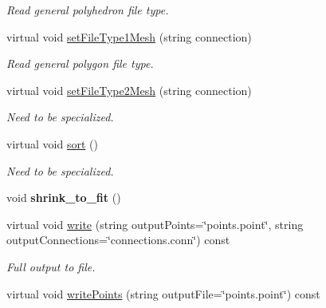 \begin{DoxyCompactItemize}
\begin{DoxyCompactList}\small\item\em \-Read general polyhedron file type. \end{DoxyCompactList}\item 
\hypertarget{class_mesh_a349da9279777b5cae335524136f85567}{virtual void \hyperlink{class_mesh_a349da9279777b5cae335524136f85567}{set\-File\-Type1\-Mesh} (string connection)}\label{class_mesh_a349da9279777b5cae335524136f85567}

\begin{DoxyCompactList}\small\item\em \-Read general polygon file type. \end{DoxyCompactList}\item 
\hypertarget{class_mesh_a03cb81990255eea926696f883279935e}{virtual void \hyperlink{class_mesh_a03cb81990255eea926696f883279935e}{set\-File\-Type2\-Mesh} (string connection)}\label{class_mesh_a03cb81990255eea926696f883279935e}

\begin{DoxyCompactList}\small\item\em \-Need to be specialized. \end{DoxyCompactList}\item 
virtual void \hyperlink{class_mesh_a5cb1110ec8bf2b1d089453f873df226f}{sort} ()
\begin{DoxyCompactList}\small\item\em \-Need to be specialized. \end{DoxyCompactList}\item 
\hypertarget{class_mesh_a9c9daf07927688c3a156ee1ef0c95900}{void {\bfseries shrink\-\_\-to\-\_\-fit} ()}\label{class_mesh_a9c9daf07927688c3a156ee1ef0c95900}

\item 
\hypertarget{class_mesh_acf271beef22b8df2fb50cd9f14da7c6a}{virtual void \hyperlink{class_mesh_acf271beef22b8df2fb50cd9f14da7c6a}{write} (string output\-Points=\char`\"{}points.\-point\char`\"{}, string output\-Connections=\char`\"{}connections.\-conn\char`\"{}) const }\label{class_mesh_acf271beef22b8df2fb50cd9f14da7c6a}

\begin{DoxyCompactList}\small\item\em \-Full output to file. \end{DoxyCompactList}\item 
\hypertarget{class_mesh_a1ff4e8213296a357a0df5b7051008ae3}{virtual void \hyperlink{class_mesh_a1ff4e8213296a357a0df5b7051008ae3}{write\-Points} (string output\-File=\char`\"{}points.\-point\char`\"{}) const }\label{class_mesh_a1ff4e8213296a357a0df5b7051008ae3}


\end{DoxyCompactItemize}
